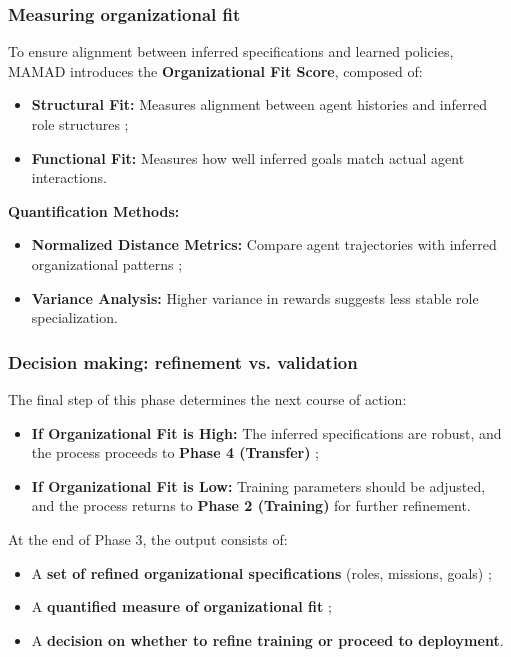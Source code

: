 \documentclass[pdflatex,sn-mathphys-num]{sn-jnl}%
\theoremstyle{thmstyleone}%
\theoremstyle{thmstyletwo}%
\theoremstyle{thmstylethree}%
\begin{document}
\subsubsection{Measuring organizational fit}
To ensure alignment between inferred specifications and learned policies, MAMAD introduces the \textbf{Organizational Fit Score}, composed of:

\begin{itemize}
    \item \textbf{Structural Fit:} Measures alignment between agent histories and inferred role structures ;
    \item \textbf{Functional Fit:} Measures how well inferred goals match actual agent interactions.
\end{itemize}

\noindent \textbf{Quantification Methods:}
\begin{itemize}
    \item \textbf{Normalized Distance Metrics:} Compare agent trajectories with inferred organizational patterns ;
    \item \textbf{Variance Analysis:} Higher variance in rewards suggests less stable role specialization.
\end{itemize}

\subsubsection{Decision making: refinement vs. validation}
The final step of this phase determines the next course of action:

\begin{itemize}
    \item \textbf{If Organizational Fit is High:} The inferred specifications are robust, and the process proceeds to \textbf{Phase 4 (Transfer)} ;
    \item \textbf{If Organizational Fit is Low:} Training parameters should be adjusted, and the process returns to \textbf{Phase 2 (Training)} for further refinement.
\end{itemize}

At the end of Phase 3, the output consists of:
\begin{itemize}
    \item A \textbf{set of refined organizational specifications} (roles, missions, goals) ;
    \item A \textbf{quantified measure of organizational fit} ;
    \item A \textbf{decision on whether to refine training or proceed to deployment}.
\end{itemize}
\end{document}
